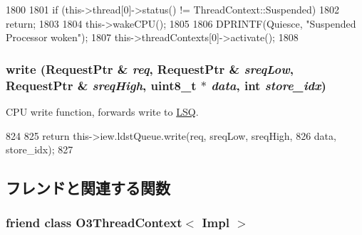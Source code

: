 \begin{DoxyCode}
1800 {
1801     if (this->thread[0]->status() != ThreadContext::Suspended)
1802         return;
1803 
1804     this->wakeCPU();
1805 
1806     DPRINTF(Quiesce, "Suspended Processor woken\n");
1807     this->threadContexts[0]->activate();
1808 }
\end{DoxyCode}
\hypertarget{classFullO3CPU_a43e0f9eec34726914d8eb76f5d884cc8}{
\subsubsection[{write}]{ write ({\bf RequestPtr} \& {\em req}, \/  {\bf RequestPtr} \& {\em sreqLow}, \/  {\bf RequestPtr} \& {\em sreqHigh}, \/  uint8\_\-t $\ast$ {\em data}, \/  int {\em store\_\-idx})}}
\label{classFullO3CPU_a43e0f9eec34726914d8eb76f5d884cc8}
CPU write function, forwards write to \hyperlink{classLSQ}{LSQ}. 


\begin{DoxyCode}
824     {
825         return this->iew.ldstQueue.write(req, sreqLow, sreqHigh,
826                                          data, store_idx);
827     }
\end{DoxyCode}


\subsection{フレンドと関連する関数}
\hypertarget{classFullO3CPU_a8744c7a2c370330e0f577992900dfb66}{
\subsubsection[{O3ThreadContext$<$ Impl $>$}]{\setlength{\rightskip}{0pt plus 5cm}friend class {\bf O3ThreadContext}$<$ Impl $>$}}
\label{classFullO3CPU_a8744c7a2c370330e0f577992900dfb66}


